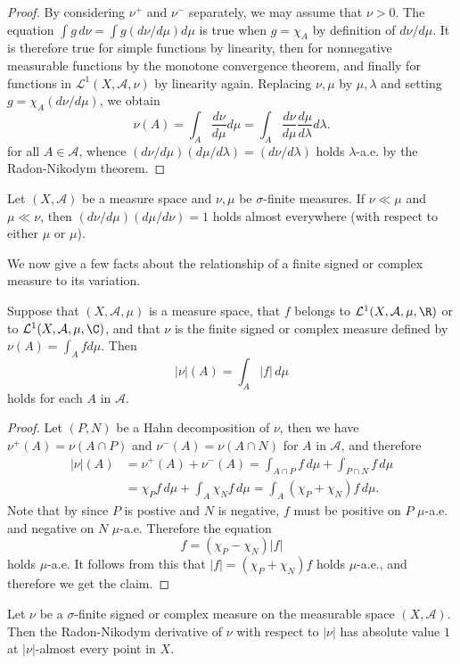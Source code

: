 \begin{proof}
By considering $\nu^+$ and $\nu^-$ separately, we may assume that $\nu>0$. The equation $\int g\,d\nu=\int g(d\nu/d\mu)d\mu$ is true when $g=\chi_A$ by definition of $d\nu/d\mu$. It is therefore true for simple functions by linearity, then for nonnegative measurable functions by the monotone convergence theorem, and finally for functions in $\mathcal{L}^1(X,\mathcal{A},\nu)$ by linearity again. Replacing $\nu,\mu$ by $\mu,\lambda$ and setting $g=\chi_A(d\nu/d\mu)$, we obtain
\[\nu(A)=\int_A\frac{d\nu}{d\mu}d\mu=\int_A\frac{d\nu}{d\mu}\frac{d\mu}{d\lambda}d\lambda.\]
for all $A\in\mathcal{A}$, whence $(d\nu/d\mu)(d\mu/d\lambda)=(d\nu/d\lambda)$ holds $\lambda$-a.e. by the Radon-Nikodym theorem.
\end{proof}
\begin{corollary}
Let $(X,\mathcal{A})$ be a measure space and $\nu,\mu$ be $\sigma$-finite measures. If $\nu\ll\mu$ and $\mu\ll\nu$, then $(d\nu/d\mu)(d\mu/d\nu)=1$ holds almost everywhere (with respect to either $\mu$ or $\mu$).
\end{corollary}
We now give a few facts about the relationship of a finite signed or complex measure to its variation.
\begin{proposition}\label{Radon-Nikodym derivative for variation}
Suppose that $(X,\mathcal{A},\mu)$ is a measure space, that $f$ belongs to $\mathcal{L}^1(X,\mathcal{A},\mu,\R)$ or to $\mathcal{L}^1(X,\mathcal{A},\mu,\C)$, and that $\nu$ is the finite signed or complex measure defined by $\nu(A)=\int_Afd\mu$. Then
\[|\nu|(A)=\int_A|f|\,d\mu\]
holds for each $A$ in $\mathcal{A}$.
\end{proposition}
\begin{proof}
Let $(P,N)$ be a Hahn decomposition of $\nu$, then we have $\nu^+(A)=\nu(A\cap P)$ and $\nu^-(A)=\nu(A\cap N)$ for $A$ in $\mathcal{A}$, and therefore
\begin{align*}
|\nu|(A)&=\nu^+(A)+\nu^-(A)=\int_{A\cap P}f\,d\mu+\int_{P\cap N}f\,d\mu\\
&=\chi_Pf\,d\mu+\int_A\chi_Nf\,d\mu=\int_A(\chi_P+\chi_N)f\,d\mu.
\end{align*}
Note that by since $P$ is postive and $N$ is negative, $f$ must be positive on $P$ $\mu$-a.e. and negative on $N$ $\mu$-a.e. Therefore the equation 
\[f=(\chi_P-\chi_N)|f|\]
holds $\mu$-a.e. It follows from this that $|f|=(\chi_P+\chi_N)f$ holds $\mu$-a.e., and therefore we get the claim.
\end{proof}
\begin{corollary}\label{Radon-Nikodym derivative dmu/d|mu|}
Let $\nu$ be a $\sigma$-finite signed or complex measure on the measurable space $(X,\mathcal{A})$. Then the Radon-Nikodym derivative of $\nu$ with respect to $|\nu|$ has absolute value $1$ at $|\nu|$-almost every point in $X$.
\end{corollary}
